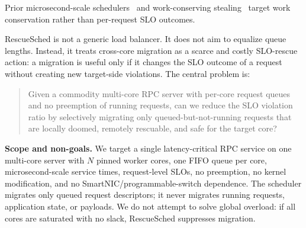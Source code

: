  Prior microsecond-scale schedulers~\cite{placeholder-shinjuku}
and work-conserving stealing~\cite{placeholder-workstealing} target work
conservation rather than per-request SLO outcomes.

RescueSched is not a generic load balancer. It does not aim to equalize
queue lengths. Instead, it treats cross-core migration as a scarce and
costly SLO-rescue action: a migration is useful only if it changes the
SLO outcome of a request without creating new target-side violations.
The central problem is:

\begin{quote}
Given a commodity multi-core RPC server with per-core request queues and
no preemption of running requests, can we reduce the SLO violation ratio
by selectively migrating only queued-but-not-running requests that are
locally doomed, remotely rescuable, and safe for the target core?
\end{quote}

\textbf{Scope and non-goals.} We target a single latency-critical RPC
service on one multi-core server with $N$ pinned worker cores, one FIFO
queue per core, microsecond-scale service times, request-level SLOs, no
preemption, no kernel modification, and no SmartNIC/programmable-switch
dependence. The scheduler migrates only queued request descriptors; it
never migrates running requests, application state, or payloads. We do
not attempt to solve global overload: if all cores are saturated with no
slack, RescueSched suppresses migration.